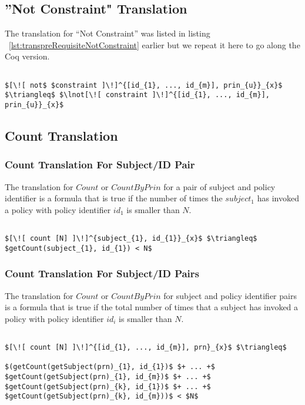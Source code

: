 \subsection{''Not Constraint" Translation}

The translation for ``Not Constraint'' was listed in listing ~\ref{lst:transpreRequisiteNotConstraint} earlier but we repeat it here to go along the Coq version. 

\lstset{mathescape, language=AST}  
\begin{lstlisting}[frame=single, caption={Not Constraint Translation},label={lst:transnotCons}]

$[\![ not$ $constraint ]\!]^{[id_{1}, ..., id_{m}], prin_{u}}_{x}$ $\triangleq$ $\lnot[\![ constraint ]\!]^{[id_{1}, ..., id_{m}], prin_{u}}_{x}$ 

\end{lstlisting}

\subsection{Count Translation}
\subsubsection{Count Translation For Subject/ID Pair}
The translation for $Count$ or $CountByPrin$ for a pair of subject and policy identifier is a formula that is true if the number of times the $subject_{1}$ has invoked a policy with policy identifier $id_{1}$ is smaller than $N$.

\lstset{mathescape, language=AST}  
\begin{lstlisting}[frame=single, caption={Count Translation {$\colon$} subject and policyId pair},label={lst:transcountSinglePair}]

$[\![ count [N] ]\!]^{subject_{1}, id_{1}}_{x}$ $\triangleq$ $getCount(subject_{1}, id_{1}) < N$
\end{lstlisting}

\subsubsection{Count Translation For Subject/ID Pairs}
The translation for $Count$ or $CountByPrin$ for subject and policy identifier pairs is a formula that is true if the total number of times that a subject has invoked a policy with policy identifier $id_{i}$ is smaller than $N$.

\lstset{mathescape, language=AST}  
\begin{lstlisting}[frame=single, caption={Count Translation {$\colon$} subject and policyId pairs},label={lst:transcountPairs}]

$[\![ count [N] ]\!]^{[id_{1}, ..., id_{m}], prn}_{x}$ $\triangleq$ 

$(getCount(getSubject(prn)_{1}, id_{1})$ $+ ... +$ $getCount(getSubject(prn)_{1}, id_{m})$ $+ ... +$ $getCount(getSubject(prn)_{k}, id_{1})$ $+ ... +$ $getCount(getSubject(prn)_{k}, id_{m}))$ < $N$


\end{lstlisting}






